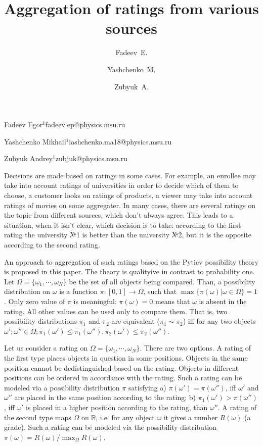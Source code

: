 \documentclass[twoside]{article}
\begin{document}
\English

\title{Aggregation of ratings from various sources}
\author{Fadeev~E.}{Fadeev Egor$^1$\speaker}{fadeev.ep@physics.msu.ru}
\author{Yashchenko~M.}{Yashchenko Mikhail$^1$}{iashchenko.ma18@physics.msu.ru}
\author{Zubyuk~A.}{Zubyuk Andrey$^1$}{zubjuk@physics.msu.ru}
\maketitle

Decisions are made based on ratings in some cases. For example, an enrollee may take into account ratings of universities in order to decide which of them to choose, a customer looks on ratings of products, a viewer may take into account ratings of movies on some aggregater. In many cases, there are several ratings on the topic from different sources, which don't always agree. This leads to a situation, when it isn't clear, which decision is to take: according to the first rating the university №1 is better than the university №2, but it is the opposite according to the second rating.

An approach to aggregation of such ratings based on the Pytiev possibility theory is proposed in this paper. The theory is qualityive in contrast to probability one. Let $\Omega = \{\omega_1, \cdots, \omega_N\}$ be the set of all objects being compared. Than, a possibility distribution on $\omega$ is a function $\pi:[0, 1]\to\Omega$, such that $\max\{\pi(\omega)|\omega\in\Omega\}=1$. Only zero value of $\pi$ is
meaningful: $\pi(\omega) = 0$ means that $\omega$ is absent in the rating. All other values can be used only to compare them. That is, two possibility distributions $\pi_1$ and $\pi_2$
are equivalent ($\pi_1\sim\pi_2$) iff for any two objects $\omega'; \omega'' \in \Omega; \pi_1(\omega') \leq \pi_1(\omega''), \pi_2(\omega') \leq \pi_2(\omega'')$.

Let us consider a rating on $\Omega = \{\omega_1, \cdots, \omega_N\}$. There are two options. A rating of the first type places objects in question in some positions. Objects in the same position cannot be dedistinguished based on the rating. Objects in different positions can be ordered in accordance with the rating. Such a rating can be modeled via a possibility distribution $\pi$ satisfying a) $\pi(\omega') = \pi(\omega'')$, iff $\omega'$ and $\omega''$ are placed in the same position according to the rating; b) $\pi_1(\omega') > \pi(\omega'')$, iff $\omega'$ is placed in a higher position according to the rating, than $\omega''$. A rating of the second type maps $\Omega$ on $\mathbb{R}$, i.e. for any object $\omega$ it gives a number $R(\omega)$ (a grade). Such a rating can be modeled via the possibility distribution $\pi(\omega) ={R(\omega)}/{\max_\Omega R(\omega)}$.
\end{document}
